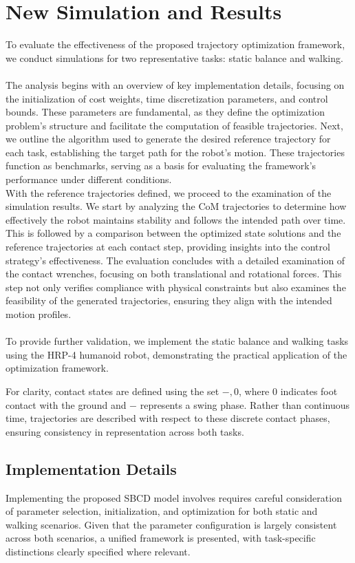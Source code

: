 \documentclass[main.tex]{subfiles}
\begin{document}
\section{New Simulation and Results}
\label{sec:newsimulation}
To evaluate the effectiveness of the proposed trajectory optimization framework, we conduct simulations for two representative tasks: static balance and walking. \\ 
\\
The analysis begins with an overview of key implementation details, focusing on the initialization of cost weights, time discretization parameters, and control bounds. These parameters are fundamental, as they define the optimization problem’s structure and facilitate the computation of feasible trajectories. Next, we outline the algorithm used to generate the desired reference trajectory for each task, establishing the target path for the robot’s motion. These trajectories function as benchmarks, serving as a basis for evaluating the framework’s performance under different conditions. \\
With the reference trajectories defined, we proceed to the examination of the simulation results. We start by analyzing the CoM trajectories to determine how effectively the robot maintains stability and follows the intended path over time. This is followed by a comparison between the optimized state solutions and the reference trajectories at each contact step, providing insights into the control strategy’s effectiveness. The evaluation concludes with a detailed examination of the contact wrenches, focusing on both translational and rotational forces. This step not only verifies compliance with physical constraints but also examines the feasibility of the generated trajectories, ensuring they align with the intended motion profiles. \\
\\
To provide further validation, we implement the static balance and walking tasks using the HRP-4 humanoid robot, demonstrating the practical application of the optimization framework. 
\begin{remark}
    For clarity, contact states are defined using the set ${-, 0}$, where $0$ indicates foot contact with the ground and $-$ represents a swing phase. Rather than continuous time, trajectories are described with respect to these discrete contact phases, ensuring consistency in representation across both tasks.
\end{remark}
\subsection{Implementation Details}
Implementing the proposed SBCD model involves requires careful consideration of parameter selection, initialization, and optimization for both static and walking scenarios. Given that the parameter configuration is largely consistent across both scenarios, a unified framework is presented, with task-specific distinctions clearly specified where relevant.
\end{document}
